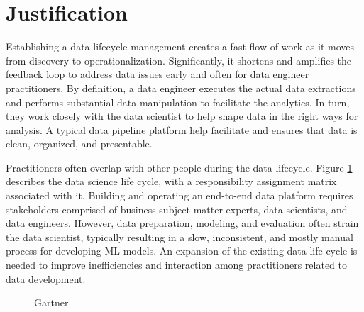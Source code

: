 \documentclass[conference]{IEEEtran}
\begin{document}
\section{Justification}
Establishing a data lifecycle management creates a fast flow of work as it moves from discovery to operationalization.  Significantly, it shortens and amplifies the feedback loop to address data issues early and often for data engineer practitioners.  By definition, a data engineer executes the actual data extractions and performs substantial data manipulation to facilitate the analytics.  In turn, they work closely with the data scientist to help shape data in the right ways for analysis.  A typical data pipeline platform help facilitate and ensures that data is clean, organized, and presentable.

Practitioners often overlap with other people during the data lifecycle. Figure \ref{fig:sdlc}\cite{gartner} describes the data science life cycle, with a responsibility assignment matrix associated with it.  Building and operating an end-to-end data platform requires stakeholders comprised of business subject matter experts, data scientists, and data engineers. However, data preparation, modeling, and evaluation often strain the data scientist, typically resulting in a slow, inconsistent, and mostly manual process for developing ML models.  An expansion of the existing data life cycle is needed to improve inefficiencies and interaction among practitioners related to data development.

\begin{figure}[bth]
	\centering
	\caption{Gartner}
	\label{fig:sdlc}
\end{figure}
\end{document}
